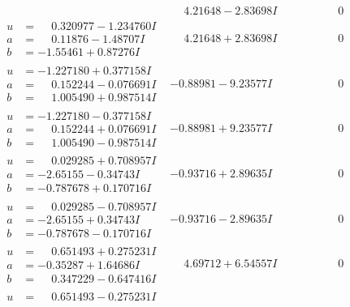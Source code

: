 \documentclass[1p]{elsarticle_modified}
\theoremstyle{definition}
\begin{document}
$$\begin{array}{c|c|c}
 & \phantom{-}4.21648 - 2.83698 I & \phantom{-0.000000 } 0 \\ \hline\begin{aligned}
u &= \phantom{-}0.320977 - 1.234760 I \\
a &= \phantom{-}0.11876 - 1.48707 I \\
b &= -1.55461 + 0.87276 I\end{aligned}
 & \phantom{-}4.21648 + 2.83698 I & \phantom{-0.000000 } 0 \\ \hline\begin{aligned}
u &= -1.227180 + 0.377158 I \\
a &= \phantom{-}0.152244 - 0.076691 I \\
b &= \phantom{-}1.005490 + 0.987514 I\end{aligned}
 & -0.88981 - 9.23577 I & \phantom{-0.000000 } 0 \\ \hline\begin{aligned}
u &= -1.227180 - 0.377158 I \\
a &= \phantom{-}0.152244 + 0.076691 I \\
b &= \phantom{-}1.005490 - 0.987514 I\end{aligned}
 & -0.88981 + 9.23577 I & \phantom{-0.000000 } 0 \\ \hline\begin{aligned}
u &= \phantom{-}0.029285 + 0.708957 I \\
a &= -2.65155 - 0.34743 I \\
b &= -0.787678 + 0.170716 I\end{aligned}
 & -0.93716 + 2.89635 I & \phantom{-0.000000 } 0 \\ \hline\begin{aligned}
u &= \phantom{-}0.029285 - 0.708957 I \\
a &= -2.65155 + 0.34743 I \\
b &= -0.787678 - 0.170716 I\end{aligned}
 & -0.93716 - 2.89635 I & \phantom{-0.000000 } 0 \\ \hline\begin{aligned}
u &= \phantom{-}0.651493 + 0.275231 I \\
a &= -0.35287 + 1.64686 I \\
b &= \phantom{-}0.347229 - 0.647416 I\end{aligned}
 & \phantom{-}4.69712 + 6.54557 I & \phantom{-0.000000 } 0 \\ \hline\begin{aligned}
u &= \phantom{-}0.651493 - 0.275231 I \\

\end{aligned}
\end{array}$$
\end{document}
